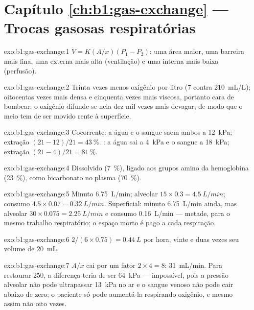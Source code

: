 \section*{Capítulo \ref{ch:b1:gas-exchange} --- Trocas gasosas respiratórias}

\begin{solution}{exo:b1:gas-exchange:1}
$\dot V = K(A/x)(P_1 - P_2)$: uma área maior, uma barreira mais fina,
uma  externa mais alta (ventilação) e uma interna mais
baixa (perfusão).
\end{solution}

\begin{solution}{exo:b1:gas-exchange:2}
Trinta vezes menos oxigênio por litro (\qty{7}{} contra
\qty{210}{mL/L}); oitocentas vezes mais densa e cinquenta vezes mais
viscosa, portanto cara de bombear; o oxigênio difunde-se nela dez mil
vezes mais devagar, de modo que o meio tem de ser movido rente à
superfície.
\end{solution}

\begin{solution}{exo:b1:gas-exchange:3}
Cocorrente: a água e o sangue saem ambos a \qty{12}{kPa}; extração
$(21 - 12)/21 = \qty{43}{\%}$. : a água sai a
\qty{4}{kPa} e o sangue a \qty{18}{kPa}; extração $(21 - 4)/21 =
\qty{81}{\%}$.
\end{solution}

\begin{solution}{exo:b1:gas-exchange:4}
Dissolvido (\qty{7}{\%}), ligado aos grupos amino da hemoglobina
(\qty{23}{\%}), como bicarbonato no plasma (\qty{70}{\%}).
\end{solution}

\begin{solution}{exo:b1:gas-exchange:5}
Minuto \qty{6.75}{L/min}; alveolar $15\times 0.3 = \qty{4.5}{L/min}$;
consumo $4.5\times 0.07 = \qty{0.32}{L/min}$. Superficial: minuto
\qty{6.75}{L/min} ainda, mas alveolar $30\times 0.075 =
\qty{2.25}{L/min}$ e consumo \qty{0.16}{L/min} --- metade, para o mesmo
trabalho respiratório; o espaço morto é pago a cada respiração.
\end{solution}

\begin{solution}{exo:b1:gas-exchange:6}
$2/(6\times 0.75) = \qty{0.44}{L}$ por hora, vinte e duas vezes seu
volume de \qty{20}{mL}.
\end{solution}

\begin{solution}{exo:b1:gas-exchange:7}
$A/x$ cai por um fator $2\times 4 = 8$: \qty{31}{mL/min}. Para
restaurar \qty{250}{}, a diferença teria de ser \qty{64}{kPa} ---
impossível, pois a pressão alveolar não pode ultrapassar \qty{13}{kPa}
no ar e o sangue venoso não pode cair abaixo de zero; o paciente só
pode aumentá-la respirando oxigênio, e mesmo assim não oito vezes.
\end{solution}

